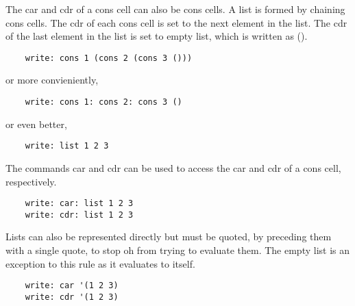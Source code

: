 \documentclass[12pt]{book}
\begin{document}
The car and cdr of a cons cell can also be cons cells. A list is formed
by chaining cons cells. The cdr of each cons cell is set to the next
element in the list. The cdr of the last element in the list is set to
empty list, which is written as ().

\begin{lstlisting}
	write: cons 1 (cons 2 (cons 3 ()))
\end{lstlisting}

or more convieniently,

\begin{lstlisting}
	write: cons 1: cons 2: cons 3 ()
\end{lstlisting}

or even better,

\begin{lstlisting}
	write: list 1 2 3
\end{lstlisting}

The commands car and cdr can be used to access the car and cdr of a
cons cell, respectively.

\begin{lstlisting}
	write: car: list 1 2 3
	write: cdr: list 1 2 3
\end{lstlisting}

Lists can also be represented directly but must be quoted, by preceding
them with a single quote, to stop oh from trying to evaluate them. The
empty list is an exception to this rule as it evaluates to itself.

\begin{lstlisting}
	write: car '(1 2 3)
	write: cdr '(1 2 3)
\end{lstlisting}
\end{document}
